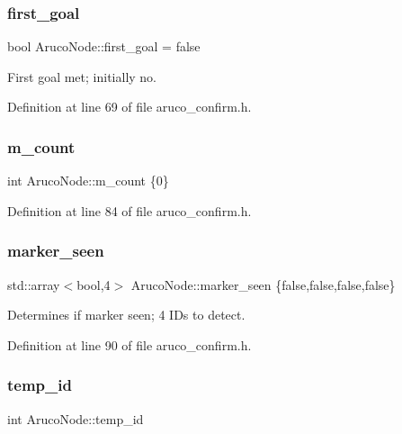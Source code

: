 \subsubsection{\texorpdfstring{first\+\_\+goal}{first\_goal}}
{\footnotesize\ttfamily bool Aruco\+Node\+::first\+\_\+goal = false}



First goal met; initially no. 



Definition at line 69 of file aruco\+\_\+confirm.\+h.

\mbox{\label{class_aruco_node_a454cdb8d15fa07e7913887a1b2029600}} 
\subsubsection{\texorpdfstring{m\+\_\+count}{m\_count}}
{\footnotesize\ttfamily int Aruco\+Node\+::m\+\_\+count \{0\}}



Definition at line 84 of file aruco\+\_\+confirm.\+h.

\mbox{\label{class_aruco_node_a2e41167c119527f9fbeb937838fc8909}} 
\subsubsection{\texorpdfstring{marker\+\_\+seen}{marker\_seen}}
{\footnotesize\ttfamily std\+::array$<$bool,4$>$ Aruco\+Node\+::marker\+\_\+seen \{false,false,false,false\}}



Determines if marker seen; 4 I\+Ds to detect. 



Definition at line 90 of file aruco\+\_\+confirm.\+h.

\mbox{\label{class_aruco_node_ac9561321e855855ccc8f643cc139a638}} 
\subsubsection{\texorpdfstring{temp\+\_\+id}{temp\_id}}
{\footnotesize\ttfamily int Aruco\+Node\+::temp\+\_\+id}



